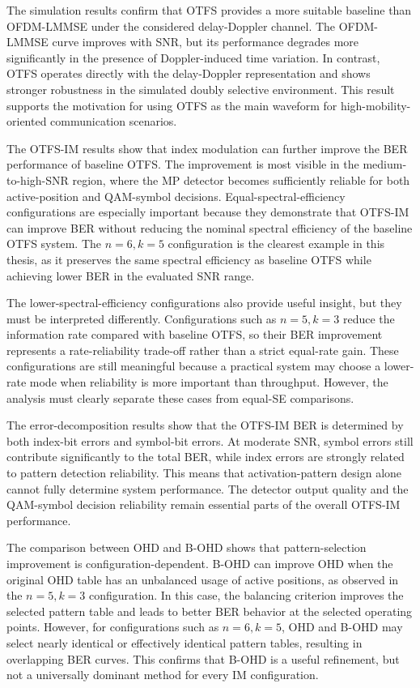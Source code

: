 The simulation results confirm that OTFS provides a more suitable baseline than OFDM-LMMSE under the considered delay-Doppler channel. The OFDM-LMMSE curve improves with SNR, but its performance degrades more significantly in the presence of Doppler-induced time variation. In contrast, OTFS operates directly with the delay-Doppler representation and shows stronger robustness in the simulated doubly selective environment. This result supports the motivation for using OTFS as the main waveform for high-mobility-oriented communication scenarios.

The OTFS-IM results show that index modulation can further improve the BER performance of baseline OTFS. The improvement is most visible in the medium-to-high-SNR region, where the MP detector becomes sufficiently reliable for both active-position and QAM-symbol decisions. Equal-spectral-efficiency configurations are especially important because they demonstrate that OTFS-IM can improve BER without reducing the nominal spectral efficiency of the baseline OTFS system. The \(n=6,k=5\) configuration is the clearest example in this thesis, as it preserves the same spectral efficiency as baseline OTFS while achieving lower BER in the evaluated SNR range.

The lower-spectral-efficiency configurations also provide useful insight, but they must be interpreted differently. Configurations such as \(n=5,k=3\) reduce the information rate compared with baseline OTFS, so their BER improvement represents a rate-reliability trade-off rather than a strict equal-rate gain. These configurations are still meaningful because a practical system may choose a lower-rate mode when reliability is more important than throughput. However, the analysis must clearly separate these cases from equal-SE comparisons.

The error-decomposition results show that the OTFS-IM BER is determined by both index-bit errors and symbol-bit errors. At moderate SNR, symbol errors still contribute significantly to the total BER, while index errors are strongly related to pattern detection reliability. This means that activation-pattern design alone cannot fully determine system performance. The detector output quality and the QAM-symbol decision reliability remain essential parts of the overall OTFS-IM performance.

The comparison between OHD and B-OHD shows that pattern-selection improvement is configuration-dependent. B-OHD can improve OHD when the original OHD table has an unbalanced usage of active positions, as observed in the \(n=5,k=3\) configuration. In this case, the balancing criterion improves the selected pattern table and leads to better BER behavior at the selected operating points. However, for configurations such as \(n=6,k=5\), OHD and B-OHD may select nearly identical or effectively identical pattern tables, resulting in overlapping BER curves. This confirms that B-OHD is a useful refinement, but not a universally dominant method for every IM configuration.


